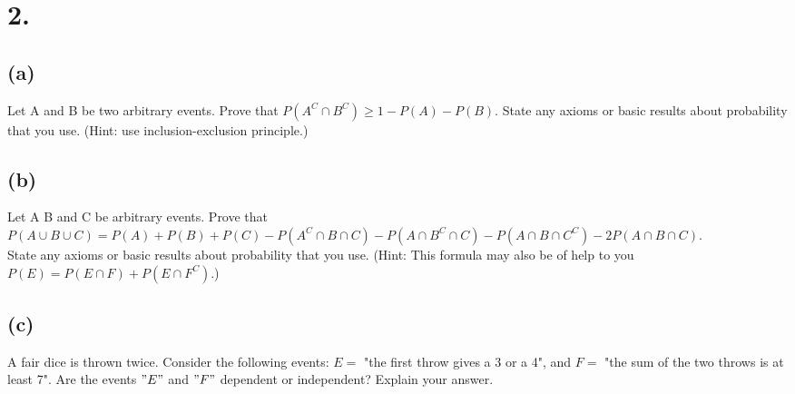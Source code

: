 \documentclass{article}
\begin{document}
\section*{2.}
{\Large

\subsection*{(a)}
Let A and B be two arbitrary events. Prove that $P(A^C \cap B^C) \geq 1 - P(A) - P(B)$. State any
axioms or basic results about probability that you use. (Hint: use inclusion-exclusion principle.)

\subsection*{(b)}
Let A B and C be arbitrary events. Prove that \\ 
$P(A \cup B \cup C) = P(A) + P(B) + P(C) - P(A^C \cap B \cap C) - P(A \cap B^C \cap C) - P(A \cap B \cap C^C) - 2P(A \cap B \cap C)$.\\ 
State any axioms or basic results about probability that you use. 
(Hint: This formula may also be of help to you $P(E) = P(E \cap F) + P(E \cap F^C)$.)


\subsection*{(c)}
A fair dice is thrown twice. Consider the following events:
$ E =$ "the first throw gives a 3 or a 4", and
$ F =$ "the sum of the two throws is at least 7".
Are the events $"E"$ and $"F"$ dependent or independent? Explain your answer.

}
\end{document}
